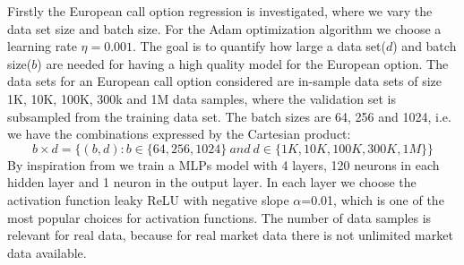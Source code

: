 Firstly the European call option regression is investigated, where we vary the data set size and batch size. For the Adam optimization algorithm we choose a learning rate $\eta=0.001$. The goal is to quantify how large a data set($d$) and batch size($b$) are needed for having a high quality model for the European option. The data sets for an European call option considered are in-sample data sets of size 1K, 10K, 100K, 300k and 1M data samples, where the validation set is subsampled from the training data set. The batch sizes are 64, 256 and 1024, i.e. we have the combinations expressed by the Cartesian product:
$$b \times d = \{(b, d) : b \in \{64, 256, 1024\} \ and \ d \in\{1K,10K,100K,300K,1M \} \}$$
By inspiration from \parencite{HirsaAli2019} we train a MLPs model with 4 layers, 120 neurons in each hidden layer and 1 neuron in the output layer. In each layer we choose the activation function leaky ReLU with negative slope $\alpha$=0.01, which is one of the most popular choices for activation functions. The number of data samples is relevant for real data, because for real market data there is not unlimited market data available.\\

